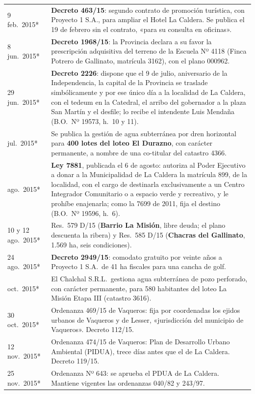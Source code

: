\begin{longtable}{@{}p{2.7cm}p{10.3cm}@{}}
9 feb.\ 2015* & \textbf{Decreto 463/15}: segundo contrato de promoción turística, con Proyecto 1 S.A., para ampliar el Hotel La Caldera. Se publica el 19 de febrero sin el contrato, «para su consulta en oficinas». \\
8 jun.\ 2015* & \textbf{Decreto 1968/15}: la Provincia declara a su favor la prescripción adquisitiva del terreno de la Escuela Nº 4118 (Finca Potrero de Gallinato, matrícula 3162), con el plano 000962. \\
29 jun.\ 2015* & \textbf{Decreto 2226}: dispone que el 9 de julio, aniversario de la Independencia, la capital de la Provincia se traslade simbólicamente y por ese único día a la localidad de La Caldera, con el tedeum en la Catedral, el arribo del gobernador a la plaza San Martín y el desfile; lo recibe el intendente Luis Mendaña (B.O.\ Nº 19573, h.\ 10 y 11). \\
jul.\ 2015* & Se publica la gestión de agua subterránea por dren horizontal para \textbf{400 lotes del loteo El Durazno}, con carácter permanente, a nombre de una co-titular del catastro 4366. \\
ago.\ 2015* & \textbf{Ley 7881}, publicada el 6 de agosto: autoriza al Poder Ejecutivo a donar a la Municipalidad de La Caldera la matrícula 899, de la localidad, con el cargo de destinarla exclusivamente a un Centro Integrador Comunitario o a espacio verde y recreativo, y le prohíbe enajenarla; como la 7699 de 2011, fija el destino (B.O.\ Nº 19596, h.\ 6). \\
10 y 12 ago.\ 2015* & Res.\ 579 D/15 (\textbf{Barrio La Misión}, libre deuda; el plano descuenta la ribera) y Res.\ 585 D/15 (\textbf{Chacras del Gallinato}, 1.569 ha, seis condiciones). \\
24 ago.\ 2015* & \textbf{Decreto 2949/15}: comodato gratuito por veinte años a Proyecto 1 S.A.\ de 41 ha fiscales para una cancha de golf. \\
oct.\ 2015* & El Chalchal S.R.L.\ gestiona agua subterránea de pozo perforado, con carácter permanente, para 580 habitantes del loteo La Misión Etapa III (catastro 3616). \\
30 oct.\ 2015* & Ordenanza 469/15 de Vaqueros: fija por coordenadas los ejidos urbanos de Vaqueros y de Lesser, «jurisdicción del municipio de Vaqueros». Decreto 112/15. \\
12 nov.\ 2015* & Ordenanza 474/15 de Vaqueros: Plan de Desarrollo Urbano Ambiental (PIDUA), trece días antes que el de La Caldera. Decreto 119/15. \\
25 nov.\ 2015* & Ordenanza Nº 643: se aprueba el PDUA de La Caldera. Mantiene vigentes las ordenanzas 040/82 y 243/97. \\

\end{longtable}
